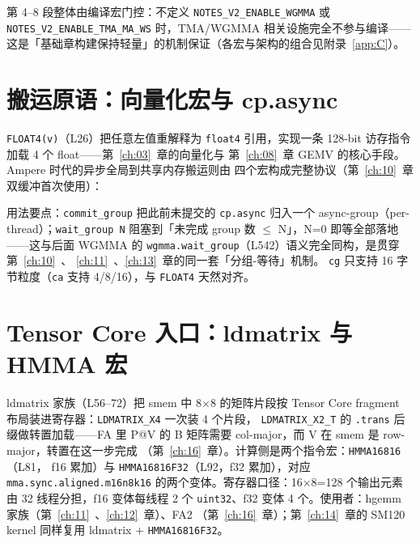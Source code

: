 第 4--8 段整体由编译宏门控：不定义 \texttt{NOTES\_\allowbreak{}V2\_\allowbreak{}ENABLE\_\allowbreak{}WGMMA} 或
\texttt{NOTES\_\allowbreak{}V2\_\allowbreak{}ENABLE\_\allowbreak{}TMA\_\allowbreak{}MA\_\allowbreak{}WS} 时，TMA/WGMMA 相关设施完全不参与编译——
这是「基础章构建保持轻量」的机制保证（各宏与架构的组合见附录~\ref{app:C}）。

\section{搬运原语：向量化宏与 cp.async}

\texttt{FLOAT4(v)}（L26）把任意左值重解释为 \texttt{float4} 引用，实现一条
128-bit 访存指令加载 4 个 float——第~\ref{ch:03}~章的向量化与
第~\ref{ch:08}~章 GEMV 的核心手段。Ampere 时代的异步全局到共享内存搬运则由
四个宏构成完整协议（第~\ref{ch:10}~章双缓冲首次使用）：



用法要点：\texttt{commit\_\allowbreak{}group} 把此前未提交的 \texttt{cp.async} 归入一个
async-group（per-thread）；\texttt{wait\_\allowbreak{}group~N} 阻塞到「未完成 group 数
$\le$ N」，N=0 即等全部落地——这与后面 WGMMA 的
\texttt{wgmma.\allowbreak{}wait\_\allowbreak{}group}（L542）语义完全同构，是贯穿第~\ref{ch:10}~、
\ref{ch:11}~、\ref{ch:13}~章的同一套「分组-等待」机制。
\texttt{cg} 只支持 16 字节粒度（\texttt{ca} 支持 4/8/16），与 \texttt{FLOAT4}
天然对齐。

\section{Tensor Core 入口：ldmatrix 与 HMMA 宏}

ldmatrix 家族（L56--72）把 smem 中 8$\times$8 的矩阵片段按 Tensor Core
fragment 布局装进寄存器：\texttt{LDMATRIX\_X4} 一次装 4 个片段，
\texttt{LDMATRIX\_\allowbreak{}X2\_\allowbreak{}T} 的 \texttt{.trans} 后缀做转置加载——FA 里 P@V 的
B 矩阵需要 col-major，而 V 在 smem 是 row-major，转置在这一步完成
（第~\ref{ch:16}~章）。计算侧是两个指令宏：\texttt{HMMA16816}（L81，
f16 累加）与 \texttt{HMMA16816\allowbreak{}F32}（L92，f32 累加），对应
\texttt{mma.\allowbreak{}sync.\allowbreak{}aligned.\allowbreak{}m16n8k16} 的两个变体。寄存器口径：16$\times$8=128
个输出元素由 32 线程分担，f16 变体每线程 2 个 \texttt{uint32}、f32 变体
4 个。使用者：hgemm 家族（第~\ref{ch:11}~、\ref{ch:12}~章）、FA2
（第~\ref{ch:16}~章）；第~\ref{ch:14}~章的 SM120 kernel 同样复用
ldmatrix + \texttt{HMMA16816\allowbreak{}F32}。

